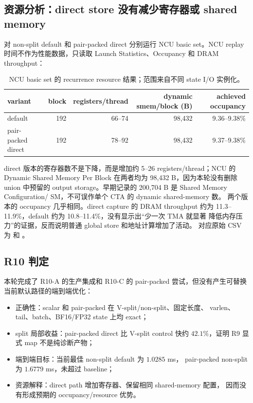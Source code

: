 \subsection{资源分析：direct store 没有减少寄存器或 shared memory}

对 non-split default 和 pair-packed direct 分别运行 NCU basic set。NCU
replay 时间不作为性能数据，只读取 Launch Statistics、Occupancy 和
DRAM throughput：

\begin{table}[htbp]
\centering
\small
\begin{tabular}{l r r r r}
\toprule
variant & block & registers/thread & dynamic smem/block (B) & achieved occupancy \\
\midrule
default & 192 & 66--74 & 98,432 & 9.36--9.38\% \\
pair-packed direct & 192 & 78--92 & 98,432 & 9.37--9.38\% \\
\bottomrule
\end{tabular}
\caption{NCU basic set 的 recurrence resource 结果；范围来自不同 state I/O 实例化。}
\end{table}

direct 版本的寄存器数不是下降，而是增加约 5--26 registers/thread；NCU 的
Dynamic Shared Memory Per Block 在两者均为 98,432 B，因为本轮没有删除 union
中预留的 output storage。早期记录的 200,704 B 是 Shared Memory Configuration/
SM，不可误作单个 CTA 的 dynamic shared-memory 数。
两个版本的 occupancy 几乎相同。direct capture 的 DRAM throughput 约为
11.3--11.9\%，default 约为 10.8--11.4\%，没有显示出“少一次 TMA 就显著
降低内存压力”的证据，反而说明普通 global store 和地址计算增加了活动。
对应原始 CSV 为
 和
。

\subsection{R10 判定}

本轮完成了 R10-A 的生产集成和 R10-C 的 pair-packed 尝试，但没有产生可替换
当前默认路径的端到端优化：

\begin{itemize}
  \item 正确性：scalar 和 pair-packed 在 V-split/non-split、固定长度、
        varlen、tail、batch、BF16/FP32 state 上均 exact；
  \item split 局部收益：pair-packed direct 比 V-split control 快约
        \(42.1\%\)，证明 R9 显式 map 不是纯诊断产物；
  \item 端到端目标：当前最佳 non-split default 为 \(1.0285\) ms，
        pair-packed non-split 为 \(1.6779\) ms，未超过 baseline；
  \item 资源解释：direct path 增加寄存器、保留相同 shared-memory 配置，
        因而没有形成预期的 occupancy/resource 优势。
\end{itemize}

